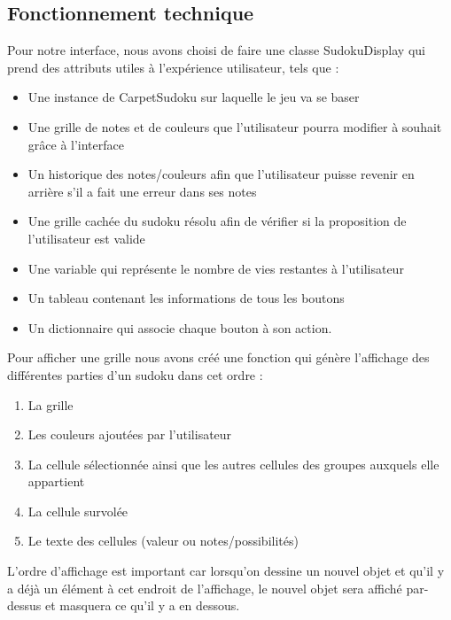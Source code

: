\documentclass[a4paper]{article}
\begin{document}
\newpage
\subsection{Fonctionnement technique}

\begin{justify}
    \noindent Pour notre interface, nous avons choisi de faire une classe SudokuDisplay qui prend des attributs utiles à l'expérience utilisateur, tels que :
    
    \begin{itemize}
        \item Une instance de CarpetSudoku sur laquelle le jeu va se baser
        \item Une grille de notes et de couleurs que l'utilisateur pourra modifier à souhait grâce à l'interface
        \item Un historique des notes/couleurs afin que l'utilisateur puisse revenir en arrière s'il a fait une erreur dans ses notes
        \item Une grille cachée du sudoku résolu afin de vérifier si la proposition de l'utilisateur est valide
        \item Une variable qui représente le nombre de vies restantes à l'utilisateur
        \item Un tableau contenant les informations de tous les boutons
        \item Un dictionnaire qui associe chaque bouton à son action.
    \end{itemize}
    
    \noindent Pour afficher une grille nous avons créé une fonction qui génère l'affichage des différentes parties d'un sudoku dans cet ordre :
    
    \begin{enumerate}
        \item La grille
        \item Les couleurs ajoutées par l'utilisateur
        \item La cellule sélectionnée ainsi que les autres cellules des groupes auxquels elle appartient
        \item La cellule survolée
        \item Le texte des cellules (valeur ou notes/possibilités)
    \end{enumerate}
    
    \noindent L'ordre d'affichage est important car lorsqu'on dessine un nouvel objet et qu'il y a déjà un élément à cet endroit de l'affichage, le nouvel objet sera affiché par-dessus et masquera ce qu'il y a en dessous. 
    

\end{justify}
\end{document}
